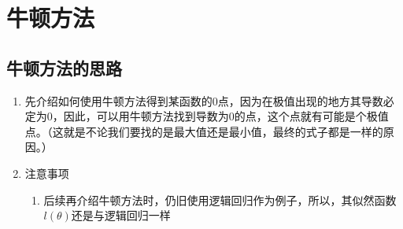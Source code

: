 \section{牛顿方法}

\subsection{牛顿方法的思路}
\begin{enumerate}
	\item 先介绍如何使用牛顿方法得到某函数的0点，因为在极值出现的地方其导数必定为0，因此，可以用牛顿方法找到导数为0的点，这个点就有可能是个极值点。（这就是不论我们要找的是最大值还是最小值，最终的式子都是一样的原因。）
	\item 注意事项
	\begin{enumerate}
		\item 后续再介绍牛顿方法时，仍旧使用逻辑回归作为例子，所以，其似然函数$l(\theta)$还是与逻辑回归一样
	\end{enumerate}
\end{enumerate}

